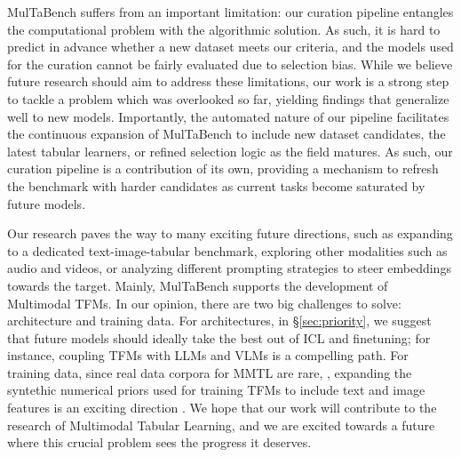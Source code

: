 \documentclass{article}
\begin{document}
MulTaBench suffers from an important limitation: our curation pipeline entangles the computational problem with the algorithmic solution. As such, it is hard to predict in advance whether a new dataset meets our criteria, and the models used for the curation cannot be fairly evaluated due to selection bias. While we believe future research should aim to address these limitations, our work is a strong step to tackle a problem which was overlooked so far, yielding findings that generalize well to new models. Importantly, the automated nature of our pipeline facilitates the continuous expansion of MulTaBench to include new dataset candidates, the latest tabular learners, or refined selection logic as the field matures. As such, our curation pipeline is a contribution of its own, providing a mechanism to refresh the benchmark with harder candidates as current tasks become saturated by future models.


Our research paves the way to many exciting future directions, such as expanding to a dedicated text-image-tabular benchmark, exploring other modalities such as audio and videos, or analyzing different prompting strategies to steer embeddings towards the target. Mainly, MulTaBench supports the development of Multimodal TFMs. In our opinion, there are two big challenges to solve: architecture and training data. For architectures, in \S\ref{sec:priority}, we suggest that future models should ideally take the best out of ICL and finetuning; for instance, coupling TFMs with LLMs and VLMs is a compelling path. For training data, since real data corpora for MMTL are rare, \cite{eggert_tablib_2023}, expanding the syntethic numerical priors used for training TFMs \cite{hollmann_accurate_2025, zhang_mitra_2025, qu_tabiclv2_2026} to include text and image features is an exciting direction \cite{luo_can_2025, brahmavar_task_2026}. We hope that our work will contribute to the research of Multimodal Tabular Learning, and we are excited towards a future where this crucial problem sees the progress it deserves.
\end{document}
